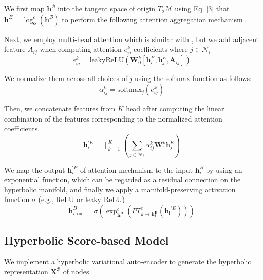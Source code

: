 \documentclass[letterpaper]{article} %
\begin{document}
We first map $\mathbf{h}^\mathcal{B}$ into the tangent space of origin $T_o\mathcal{M}$ using Eq. \eqref{3} that $\mathbf{h}^E=\log _{\boldsymbol{o}}^{c}(\mathbf{h}^\mathcal{B})$ to perform the following attention aggregation mechanism \cite{velivckovic2017graph}. 

Next, we employ multi-head attention which is similar with \cite{velivckovic2017graph}, but we add adjacent feature $A_{ij}$ when computing attention $e^k_{i j}$ coefficients where $j\in \mathcal{N}_i$ 
\begin{equation}
e^{k}_{i j}=\text{leakyReLU}\left(\mathbf{W}^{k}_0 [\mathbf{h}^{E}_{i}, \mathbf{h}^{E}_{j},\mathbf{A}_{ij}]\right)
\end{equation}

We normalize them across all choices of $j$ using the softmax function as follows:
\begin{equation}
\alpha^{k}_{i j}=\mathrm{softmax}_j(e^{k}_{i j})
\end{equation}
% 

Then, we concatenate features from $K$ head after computing the linear combination of the features corresponding to the normalized attention coefficients.
\begin{equation}
\mathbf{h}_{i}^{\prime E}=\mathop{\parallel}_{k=1}^{K}\left(\sum_{j \in \mathcal{N}_{i}} \alpha_{i j}^{k} \mathbf{W}^{k}_1 \mathbf{h}^{E}_{j}\right)
\end{equation}

We map the output $\mathbf{h}_{i}^{\prime E}$ of attention mechanism to the input $\mathbf{h}^B_i$ by using an exponential function, which can be regarded as a residual connection \cite{he2016deep} on the hyperbolic manifold, and finally we apply a manifold-preserving activation function $\sigma$ (e.g., ReLU or leaky ReLU) \cite{liu2019hyperbolic}.
\begin{equation}
\mathbf{h}_{i,\text{out}}^{B}=\sigma(\exp _{\boldsymbol{\mathbf{h}_{i}^B}}^{c}(P T_{\mathbf{o} \rightarrow \mathbf{h_{i}^B}}^{c}(\mathbf{h_{i}}^{\prime E})))
\end{equation}


%
\subsection{Hyperbolic Score-based Model}
%
We implement a hyperbolic variational auto-encoder to generate the hyperbolic representation $\boldsymbol{X}^\mathcal{B}$ of nodes. 
\end{document}

